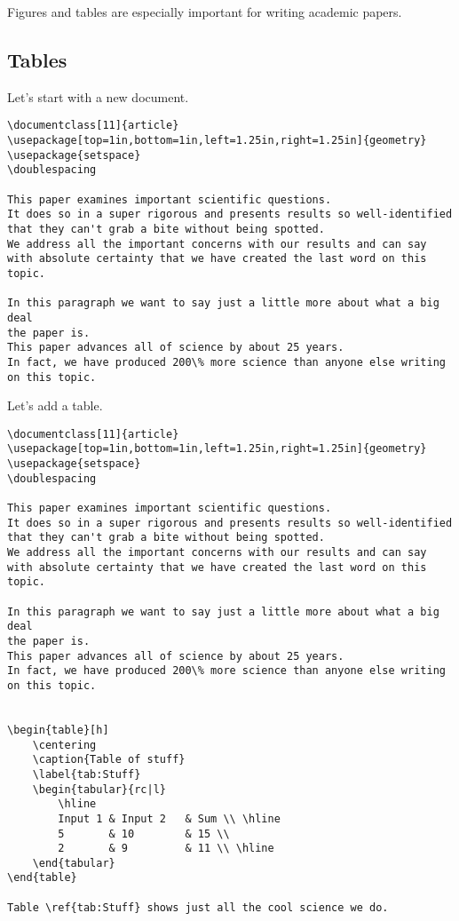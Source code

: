 Figures and tables are especially important for writing academic papers.

\subsection{Tables}

Let's start with a new document.

\begin{lstlisting}
\documentclass[11]{article}
\usepackage[top=1in,bottom=1in,left=1.25in,right=1.25in]{geometry}
\usepackage{setspace}
\doublespacing

This paper examines important scientific questions.
It does so in a super rigorous and presents results so well-identified that they can't grab a bite without being spotted.
We address all the important concerns with our results and can say with absolute certainty that we have created the last word on this topic.

In this paragraph we want to say just a little more about what a big deal
the paper is.
This paper advances all of science by about 25 years.
In fact, we have produced 200\% more science than anyone else writing on this topic.

\end{lstlisting}

Let's add a table.

\begin{lstlisting}
\documentclass[11]{article}
\usepackage[top=1in,bottom=1in,left=1.25in,right=1.25in]{geometry}
\usepackage{setspace}
\doublespacing

This paper examines important scientific questions.
It does so in a super rigorous and presents results so well-identified that they can't grab a bite without being spotted.
We address all the important concerns with our results and can say with absolute certainty that we have created the last word on this topic.

In this paragraph we want to say just a little more about what a big deal
the paper is.
This paper advances all of science by about 25 years.
In fact, we have produced 200\% more science than anyone else writing on this topic.


\begin{table}[h]
	\centering
	\caption{Table of stuff}
	\label{tab:Stuff}
	\begin{tabular}{rc|l}
		\hline
		Input 1	& Input 2	& Sum \\ \hline
		5 		& 10 		& 15 \\
		2 		& 9 		& 11 \\ \hline
	\end{tabular}
\end{table}

Table \ref{tab:Stuff} shows just all the cool science we do.

\end{lstlisting}

